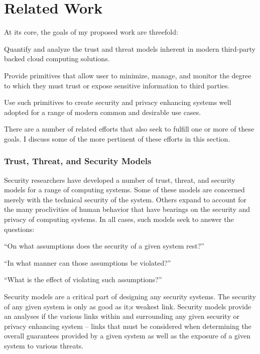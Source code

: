 \chapter{Related Work}
\label{chap:related}

At its core, the goals of my proposed work are threefold:

\begin{packed_item}
\item Quantify and analyze the trust and threat models inherent in
  modern third-party backed cloud computing solutions.
\item Provide primitives that allow user to minimize, manage, and
  monitor the degree to which they must trust or expose sensitive
  information to third parties.
\item Use such primitives to create security and privacy enhancing
  systems well adopted for a range of modern common and desirable use
  cases.
\end{packed_item}

There are a number of related efforts that also seek to fulfill one or
more of these goals. I discuss some of the more pertinent of these
efforts in this section.

\subsection{Trust, Threat, and Security Models}

Security researchers have developed a number of trust, threat, and
security models for a range of computing systems. Some of these models
are concerned merely with the technical security of the system. Others
expand to account for the many proclivities of human behavior that
have bearings on the security and privacy of computing systems. In all
cases, such models seek to answer the questions:

\begin{packed_item}
\item ``On what assumptions does the security of a given system rest?''
\item ``In what manner can those assumptions be violated?''
\item ``What is the effect of violating such assumptions?''
\end{packed_item}

Security models are a critical part of designing any security
systems. The security of any given system is only as good as it;s
weakest link. Security models provide an analyses if the various links
within and surrounding any given security or privacy enhancing system
-- links that must be considered when determining the overall
guarantees provided by a given system as well as the exposure of a
given system to various threats.

